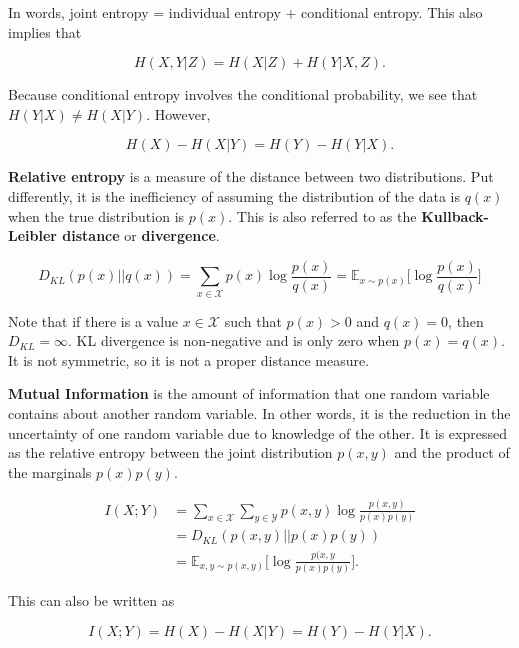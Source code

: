 \noindent In words, joint entropy = individual entropy + conditional entropy. This also implies that

\begin{equation}
	H(X, Y | Z) = H(X | Z) + H(Y | X, Z).
\end{equation}

\noindent Because conditional entropy involves the conditional probability, we see that $H(Y | X) \neq H(X | Y)$. However,

\begin{equation}
	H(X) - H(X | Y) = H(Y) - H(Y | X).
\end{equation}

\textbf{Relative entropy} is a measure of the distance between two distributions. Put differently, it is the inefficiency of assuming the distribution of the data is $q(x)$ when the true distribution is $p(x)$. This is also referred to as the \textbf{Kullback-Leibler distance} or \textbf{divergence}.

\begin{equation}
	D_{KL} (p(x) || q(x)) = \sum_{x \in \mathcal{X}} p(x) \log \frac{p(x)}{q(x)} = \mathbb{E}_{x \sim p(x)} \Big[ \log \frac{p(x)}{q(x)} \Big]
	\label{eq: KL_definition}
\end{equation}

\noindent Note that if there is a value $x \in \mathcal{X}$ such that $p(x) > 0$ and $q(x) = 0$, then $D_{KL} = \infty$. KL divergence is non-negative and is only zero when $p(x) = q(x)$. It is not symmetric, so it is not a proper distance measure.

\textbf{Mutual Information} is the amount of information that one random variable contains about another random variable. In other words, it is the reduction in the uncertainty of one random variable due to knowledge of the other. It is expressed as the relative entropy between the joint distribution $p(x, y)$ and the product of the marginals $p(x) p(y)$.

\begin{align*}
	I(X; Y) &= \sum_{x \in \mathcal{X}} \sum_{y \in \mathcal{Y}} p(x, y) \log \frac{p(x, y)}{p(x) p(y)} \\
	           &= D_{KL} (p(x, y) || p(x) p(y)) \\
	           &= \mathbb{E}_{x, y \sim p(x, y)} \Big[ \log \frac{p(x, y}{p(x) p(y)} \Big].
\end{align*}

\noindent This can also be written as

\begin{equation}
	I(X; Y) = H(X) - H(X | Y) = H(Y) - H(Y | X).
\end{equation}

